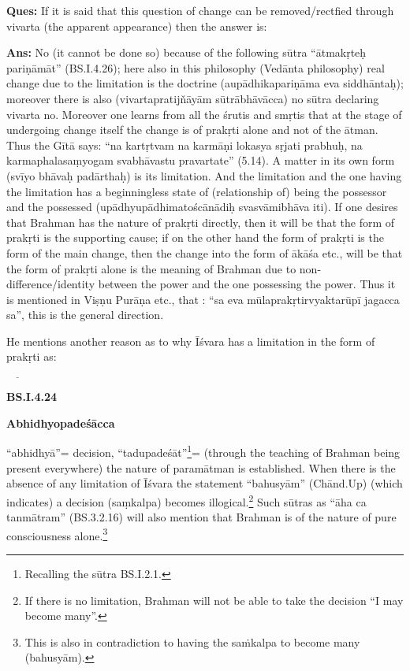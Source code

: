 \textbf{Ques:} If it is said that this question of change can be removed/rectfied  through vivarta (the apparent appearance) then the answer is:

\newpage

\textbf{Ans:} No (it cannot be done so) because of the following sūtra “ātmakṛteḥ pariṇāmāt” (BS.I.4.26); here also in this philosophy (Vedānta philosophy) real change due to the limitation is the doctrine (aupādhikapariṇāma eva siddhāntaḥ); moreover there is also (vivartapratijňāyām sūtrābhāvācca) no sūtra declaring vivarta no. Moreover one learns from all the śrutis and smṛtis that at the stage of undergoing change itself the change is of prakṛti alone and not of the ātman. Thus the Gītā says: “na kartṛtvam na karmāṇi lokasya sṛjati prabhuḥ, na karmaphalasaṃyogam svabhāvastu pravartate” (5.14). A matter in its own form (svīyo bhāvaḥ padārthaḥ) is its limitation. And the limitation and the one having the limitation has a beginningless state of (relationship of) being the possessor and the possessed  (upādhyupādhimatoścānādiḥ svasvāmibhāva iti). If one desires that Brahman has the nature of prakṛti directly, then it will be that the form of prakṛti is the supporting cause; if on the other hand the form of prakṛti is the form of the main change, then the change into the form of ākāśa etc., will be that the form of prakṛti alone is the meaning of Brahman due to non-difference/identity between the power and the one possessing the power. Thus it is mentioned in Viṣṇu Purāṇa etc., that : “sa eva mūlaprakṛtirvyaktarūpī jagacca sa”, this is the general direction.

He mentions another reason as to why Īśvara has a limitation in the form of prakṛti as: 

\textbf{}


 $\underline{\qquad}$

\textbf{BS.I.4.24}

\textbf{Abhidhyopadeśācca}

“abhidhyā”= decision, “tadupadeśāt”\footnote{Recalling the sūtra BS.I.2.1.}= (through the teaching of Brahman being present everywhere) the nature of paramātman is established. When there is the absence of any limitation of Īśvara the statement “bahusyām” (Chānd.Up) (which indicates) a decision (saṃkalpa) becomes illogical.\footnote{If there is no limitation, Brahman will not be able to take the decision “I may become many”.} Such sūtras as “āha ca tanmātram” (BS.3.2.16) will also mention that Brahman is of the nature of pure consciousness alone.\footnote{This is also in contradiction to having the saṁkalpa to become many (bahusyām).}

